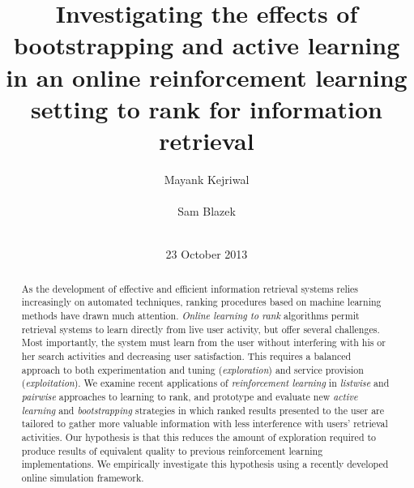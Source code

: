 \documentclass{acm_proc_article-sp}
\begin{document}
\title{Investigating the effects of bootstrapping and active learning in an online reinforcement learning setting to rank for information retrieval}


\author{
\alignauthor
Mayank Kejriwal\\
       \\
\alignauthor
Sam Blazek\\
       \\
}

\date{23 October 2013}


\maketitle
\begin{abstract}
As the development of effective and efficient information retrieval systems relies increasingly on automated techniques, ranking procedures based on machine learning methods have drawn much attention. \emph{Online learning to rank} algorithms permit retrieval systems to learn directly from live user activity, but offer several challenges. Most importantly, the system must learn from the user without interfering with his or her search activities and decreasing user satisfaction. This requires a balanced approach to both experimentation and tuning (\emph{exploration}) and service provision (\emph{exploitation}). We examine recent applications of \emph{reinforcement learning} in \emph{listwise} and \emph{pairwise} approaches to learning to rank, and prototype and evaluate new \emph{active learning} and \emph{bootstrapping} strategies in which ranked results presented to the user are tailored to gather more valuable information with less interference with users' retrieval activities. Our hypothesis is that this reduces the amount of exploration required to produce results of equivalent quality to previous reinforcement learning implementations. We empirically investigate this hypothesis using a recently developed online simulation framework.
\end{abstract}


\end{document}
